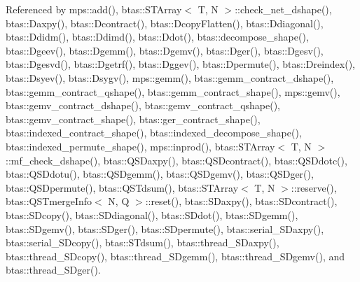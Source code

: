 Referenced by mps\-::add(), btas\-::\-S\-T\-Array$<$ T, N $>$\-::check\-\_\-net\-\_\-dshape(), btas\-::\-Daxpy(), btas\-::\-Dcontract(), btas\-::\-Dcopy\-Flatten(), btas\-::\-Ddiagonal(), btas\-::\-Ddidm(), btas\-::\-Ddimd(), btas\-::\-Ddot(), btas\-::decompose\-\_\-shape(), btas\-::\-Dgeev(), btas\-::\-Dgemm(), btas\-::\-Dgemv(), btas\-::\-Dger(), btas\-::\-Dgesv(), btas\-::\-Dgesvd(), btas\-::\-Dgetrf(), btas\-::\-Dggev(), btas\-::\-Dpermute(), btas\-::\-Dreindex(), btas\-::\-Dsyev(), btas\-::\-Dsygv(), mps\-::gemm(), btas\-::gemm\-\_\-contract\-\_\-dshape(), btas\-::gemm\-\_\-contract\-\_\-qshape(), btas\-::gemm\-\_\-contract\-\_\-shape(), mps\-::gemv(), btas\-::gemv\-\_\-contract\-\_\-dshape(), btas\-::gemv\-\_\-contract\-\_\-qshape(), btas\-::gemv\-\_\-contract\-\_\-shape(), btas\-::ger\-\_\-contract\-\_\-shape(), btas\-::indexed\-\_\-contract\-\_\-shape(), btas\-::indexed\-\_\-decompose\-\_\-shape(), btas\-::indexed\-\_\-permute\-\_\-shape(), mps\-::inprod(), btas\-::\-S\-T\-Array$<$ T, N $>$\-::mf\-\_\-check\-\_\-dshape(), btas\-::\-Q\-S\-Daxpy(), btas\-::\-Q\-S\-Dcontract(), btas\-::\-Q\-S\-Ddotc(), btas\-::\-Q\-S\-Ddotu(), btas\-::\-Q\-S\-Dgemm(), btas\-::\-Q\-S\-Dgemv(), btas\-::\-Q\-S\-Dger(), btas\-::\-Q\-S\-Dpermute(), btas\-::\-Q\-S\-Tdsum(), btas\-::\-S\-T\-Array$<$ T, N $>$\-::reserve(), btas\-::\-Q\-S\-Tmerge\-Info$<$ N, Q $>$\-::reset(), btas\-::\-S\-Daxpy(), btas\-::\-S\-Dcontract(), btas\-::\-S\-Dcopy(), btas\-::\-S\-Ddiagonal(), btas\-::\-S\-Ddot(), btas\-::\-S\-Dgemm(), btas\-::\-S\-Dgemv(), btas\-::\-S\-Dger(), btas\-::\-S\-Dpermute(), btas\-::serial\-\_\-\-S\-Daxpy(), btas\-::serial\-\_\-\-S\-Dcopy(), btas\-::\-S\-Tdsum(), btas\-::thread\-\_\-\-S\-Daxpy(), btas\-::thread\-\_\-\-S\-Dcopy(), btas\-::thread\-\_\-\-S\-Dgemm(), btas\-::thread\-\_\-\-S\-Dgemv(), and btas\-::thread\-\_\-\-S\-Dger().

